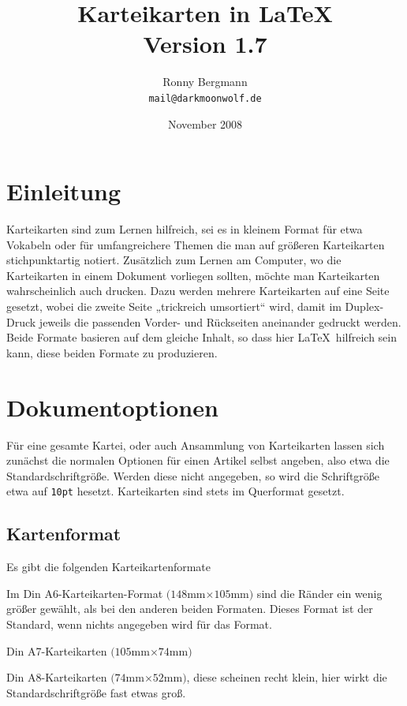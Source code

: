 \documentclass[a4paper]{article}
\begin{document}
\title{Karteikarten in \LaTeX\\{\normalsize Version 1.7}}
\author{Ronny Bergmann\\\texttt{mail@darkmoonwolf.de}}
\date{November 2008}
\maketitle
\section{Einleitung}
Karteikarten sind zum Lernen hilfreich, sei es in kleinem Format für etwa Vokabeln oder für umfangreichere Themen die man auf größeren Karteikarten stichpunktartig notiert. Zusätzlich zum Lernen am Computer, wo die Karteikarten in einem Dokument vorliegen sollten, möchte man Karteikarten wahrscheinlich auch drucken. Dazu werden mehrere Karteikarten auf eine Seite gesetzt, wobei die zweite Seite „trickreich umsortiert“ wird, damit im Duplex-Druck jeweils die passenden Vorder- und Rückseiten aneinander gedruckt werden. Beide Formate basieren auf dem gleiche Inhalt, so dass hier \LaTeX\ hilfreich sein kann, diese beiden Formate zu produzieren.

\section{Dokumentoptionen}
Für eine gesamte Kartei, oder auch Ansammlung von Karteikarten lassen sich zunächst die normalen Optionen für einen Artikel selbst angeben, also etwa die Standardschriftgröße. Werden diese nicht angegeben, so wird die Schriftgröße etwa auf \lstinline!10pt! hesetzt. Karteikarten sind stets im Querformat gesetzt.
\subsection{Kartenformat}
Es gibt die folgenden Karteikartenformate
\begin{description}
	\item[{\sffamily a6paper}] Im Din A6-Karteikarten-Format $(148$mm$\times 105$mm$)$ sind die Ränder ein wenig größer gewählt, als bei den anderen beiden Formaten. Dieses Format ist der Standard, wenn nichts angegeben wird für das Format.
	\item[{\sffamily a7paper}] Din A7-Karteikarten $(105$mm$\times 74$mm$)$
	\item[{\sffamily a8paper}] Din A8-Karteikarten $(74$mm$\times 52$mm$)$, diese scheinen recht klein, hier wirkt die Standardschriftgröße fast etwas groß.
\end{description}
\end{document}
